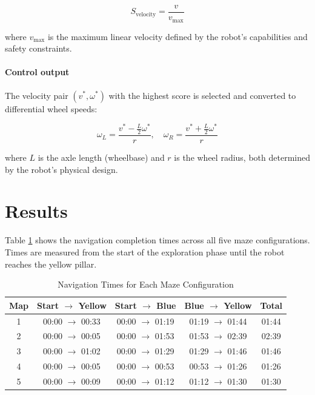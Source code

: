 \documentclass{article}
\begin{document}
$$
S_{\text{velocity}} = \frac{v}{v_{\text{max}}}
$$

\noindent where $v_{\text{max}}$ is the maximum linear velocity defined by the robot's capabilities and safety constraints.

\paragraph{Control output}

The velocity pair $(v^*, \omega^*)$ with the highest score is selected and converted to differential wheel speeds:

$$
\omega_L = \frac{v^* - \frac{L}{2} \omega^*}{r}, \quad \omega_R = \frac{v^* + \frac{L}{2} \omega^*}{r}
$$

\noindent where $L$ is the axle length (wheelbase) and $r$ is the wheel radius, both determined by the robot's physical design.

\newpage

\section{Results}


Table \ref{tab:navigation_times} shows the navigation completion times across all five maze configurations. Times are measured from the start of the exploration phase until the robot reaches the yellow pillar.

\begin{table}[H]
\centering
\caption{Navigation Times for Each Maze Configuration}
\label{tab:navigation_times}
\begin{tabular}{c|c|c|c|c}
\toprule
\textbf{Map} & \textbf{Start $\rightarrow$ Yellow} & \textbf{Start $\rightarrow$ Blue} & \textbf{Blue $\rightarrow$ Yellow} & \textbf{Total} \\
\midrule
1 & 00:00 $\rightarrow$ 00:33 & 00:00 $\rightarrow$ 01:19 & 01:19 $\rightarrow$ 01:44  & 01:44 \\
\midrule
2 & 00:00 $\rightarrow$ 00:05 & 00:00 $\rightarrow$ 01:53 & 01:53 $\rightarrow$ 02:39 & 02:39 \\
\midrule
3 & 00:00 $\rightarrow$ 01:02 & 00:00 $\rightarrow$ 01:29 & 01:29 $\rightarrow$ 01:46 & 01:46 \\
\midrule
4 & 00:00 $\rightarrow$ 00:05 & 00:00 $\rightarrow$ 00:53 & 00:53 $\rightarrow$ 01:26 & 01:26 \\
\midrule
5 & 00:00 $\rightarrow$ 00:09 & 00:00 $\rightarrow$ 01:12 & 01:12 $\rightarrow$ 01:30 & 01:30 \\
\bottomrule
\end{tabular}
\end{table}
\end{document}
